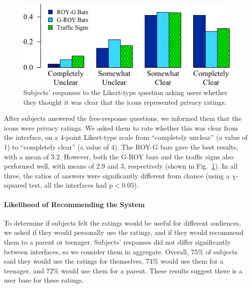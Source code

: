 \documentclass[11pt]{article}
\begin{document}
\begin{figure}
\begin{center}
\includegraphics[width=.9\linewidth]{graphs/ClarityHistLikert.png}
    \caption{Subjects' responses to the Likert-type question asking users whether they thought it was clear that the icons represented privacy ratings.}
    \label{likert}\end{center}
\end{figure}

After subjects answered the free-response questions, we informed them that 
the icons were privacy ratings. We asked them to rate whether this was 
clear from the interface, on a 4-point Likert-type scale from ``completely 
unclear'' (a value of 1) to ``completely clear'' (a value of 4).
The ROY-G bars gave the best results, with a mean of 3.2.
However, both the G-ROY bars and the traffic signs also performed well,
with means of 2.9 and 3, respectively (shown in Fig.~\ref{likert}). 
In all three, the ratios of answers were 
significantly different from chance (using a $\chi$-squared test, all the interfaces had 
$\mathrm{p}< 0.05$).

\paragraph{Likelihood of Recommending the System}
\label{ssec-est-usage}

To determine if subjects felt the ratings would be useful for 
different audiences, we asked if 
they would personally use the ratings, and if
they would recommend them to a parent or
teenager. Subjects' responses did not 
differ significantly between interfaces, so we consider 
them in aggregate. Overall, 75\% of subjects said they would use the
ratings for themselves, 
74\% would use them for a teenager, and 72\% would use them for a parent. 
These results suggest there is a user base for these ratings.
\end{document}
